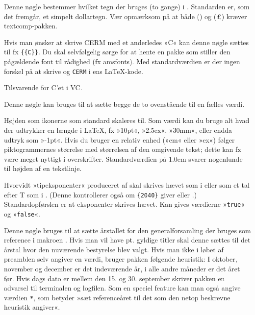 \documentclass[a4paper,article,oneside]{memoir}
\newcommand{\pakkenavn}[1]{\textsf{#1}}
\newcommand*{\descopt}[1]{%
  \medskip\noindent\llap{\color{option}#1\hspace*{8pt}}\ignorespaces}
\begin{document}
\descopt{dollar} Denne nøgle bestemmer hvilket tegn der bruges (to
gange) i . Standarden er, som det fremgår, et simpelt
dollartegn. Vær opmærksom på at både 
(\textdollaroldstyle) og  (\pounds) kræver
\pakkenavn{textcomp}-pakken.

\descopt{cermC} Hvis man ønsker at skrive CERM med et anderledes »C«
kan denne nøgle sættes til fx
\texttt{\{}\texttt{\{C\}\}}. Du skal
selvfølgelig sørge for at hente en pakke som stiller den pågældende
font til rådighed (fx \pakkenavn{amsfonts}). Med standardværdien er
der ingen forskel på at skrive  og \texttt{CERM} i ens
\LaTeX-kode.

\descopt{vcC} Tilsvarende for C'et i VC.

\descopt{C} Denne nøgle kan bruges til at sætte begge de to
ovenstående til en fælles værdi.

\descopt{ikonh} Højden som ikonerne som standard skaleres
til. Som værdi kan du bruge alt hvad der udtrykker en længde i \LaTeX,
fx »10pt«, »2.5ex«, »30mm«, eller endda udtryk som
»-1pt«. Hvis du bruger en relativ enhed (»em« eller
»ex«) følger piktogrammernes størrelse med størrelsen af den omgivende
tekst; dette kan fx være meget nyttigt i overskrifter. Standardværdien
på 1.0em svarer nogenlunde til højden af en tekstlinje.

\descopt{eksponent} Hvorvidt »tipeksponenter« produceret af
 skal skrives hævet som i {\KASS} eller
som et tal efter T som i
{}. (Denne kontrollerer
også om \texttt{\{2040\}} giver  eller
{}.) Standardopførslen er at
eksponenter skrives hævet. Kan gives værdierne »\texttt{true}« og
»\texttt{false}«.

\descopt{gf} Denne nøgle bruges til at sætte årstallet for den
generalforsamling der bruges som reference i makroen
. Hvis man vil have pt. gyldige titler skal denne sættes
til det årstal hvor den nuværende bestyrelse blev valgt. Hvis man ikke
i løbet af preamblen selv angiver en værdi, bruger pakken følgende
heuristik: I oktober, november og december er det indeværende år, i
alle andre måneder er det året før. Hvis dags dato er mellem den
15. og 30. september skriver pakken en advarsel til terminalen og
logfilen. Som en speciel feature kan man også angive værdien
\texttt{*}, som betyder »sæt referenceåret til det som den netop
beskrevne heuristik angiver«.
\end{document}
